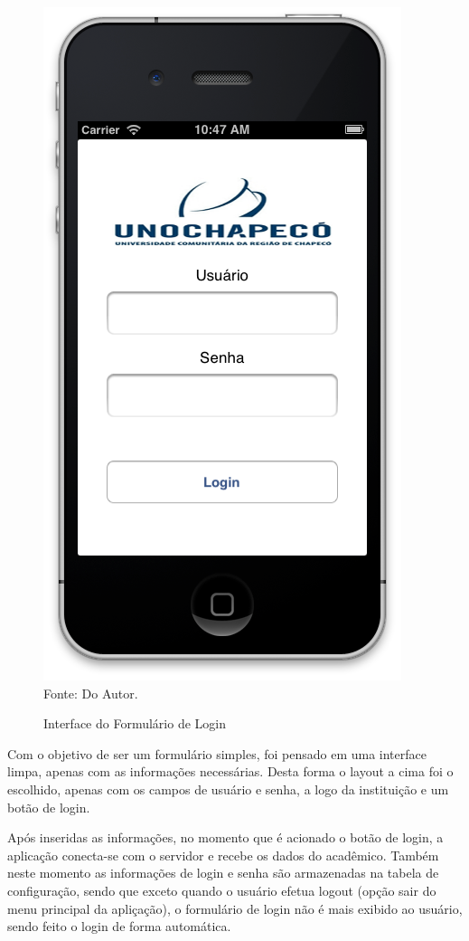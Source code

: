 \begin{figure}[!htb]
     \centering
     \caption[Formulário de Login - Interface]{Interface do Formulário de Login}
     \includegraphics[scale=0.34]{imagens/formlogin.png}
     \\  Fonte: Do Autor.
\end{figure}

Com o objetivo de ser um formulário simples, foi pensado em uma interface limpa, apenas com as informações necessárias. Desta forma o layout a cima foi o escolhido, apenas com os campos de usuário e senha, a logo da instituição e um botão de login.

Após inseridas as informações, no momento que é acionado o botão de login, a aplicação conecta-se com o servidor e recebe os dados do acadêmico. Também neste momento as informações de login e senha são armazenadas na tabela de configuração, sendo que exceto quando o usuário efetua logout (opção sair do menu principal da apliçação), o formulário de login não é mais exibido ao usuário, sendo feito o login de forma automática.

